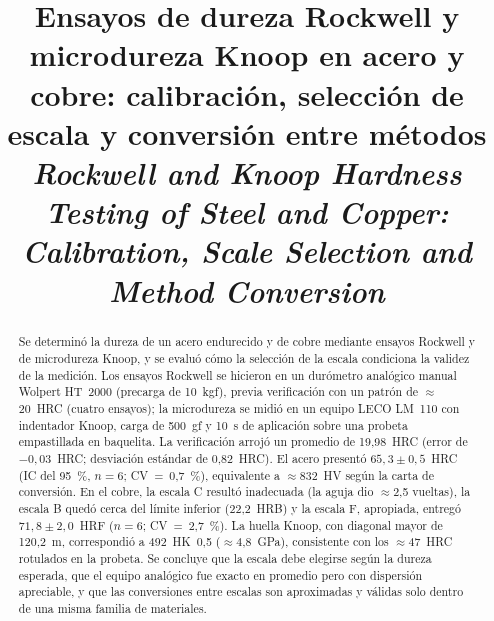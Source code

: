 \documentclass[journal,11pt]{IEEEtran}
\begin{document}
\title{Ensayos de dureza Rockwell y microdureza Knoop en acero y cobre:
calibración, selección de escala y conversión entre métodos\\[3pt]
\large\textit{Rockwell and Knoop Hardness Testing of Steel and Copper:
Calibration, Scale Selection and Method Conversion}}

\author{%
}

\maketitle

\begin{abstract}
Se determinó la dureza de un acero endurecido y de cobre mediante ensayos Rockwell y de microdureza Knoop, y se evaluó cómo la selección de la escala condiciona la validez de la medición. Los ensayos Rockwell se hicieron en un durómetro analógico manual Wolpert HT~2000 (precarga de 10~kgf), previa verificación con un patrón de $\approx$20~HRC (cuatro ensayos); la microdureza se midió en un equipo LECO LM~110 con indentador Knoop, carga de 500~gf y 10~s de aplicación sobre una probeta empastillada en baquelita. La verificación arrojó un promedio de 19,98~HRC (error de $-0{,}03$~HRC; desviación estándar de 0,82~HRC). El acero presentó $65{,}3\pm0{,}5$~HRC (IC del 95~\%, $n=6$; CV~=~0,7~\%), equivalente a $\approx$832~HV según la carta de conversión. En el cobre, la escala C resultó inadecuada (la aguja dio $\approx$2,5 vueltas), la escala B quedó cerca del límite inferior (22,2~HRB) y la escala F, apropiada, entregó $71{,}8\pm2{,}0$~HRF ($n=6$; CV~=~2,7~\%). La huella Knoop, con diagonal mayor de 120,2~\textmu m, correspondió a 492~HK~0,5 ($\approx$4,8~GPa), consistente con los $\approx$47~HRC rotulados en la probeta. Se concluye que la escala debe elegirse según la dureza esperada, que el equipo analógico fue exacto en promedio pero con dispersión apreciable, y que las conversiones entre escalas son aproximadas y válidas solo dentro de una misma familia de materiales.
\end{abstract}
\end{document}
